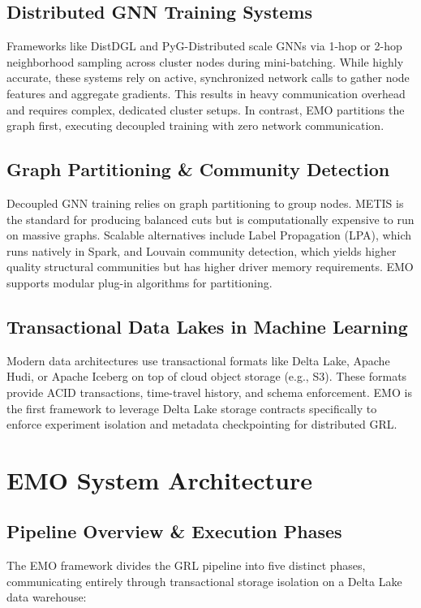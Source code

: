 \documentclass[conference,compsoc]{IEEEtran}
\begin{document}
\subsection{Distributed GNN Training Systems}
Frameworks like DistDGL and PyG-Distributed scale GNNs via 1-hop or 2-hop neighborhood sampling across cluster nodes during mini-batching. While highly accurate, these systems rely on active, synchronized network calls to gather node features and aggregate gradients. This results in heavy communication overhead and requires complex, dedicated cluster setups. In contrast, EMO partitions the graph first, executing decoupled training with zero network communication.

\subsection{Graph Partitioning \& Community Detection}
Decoupled GNN training relies on graph partitioning to group nodes. METIS is the standard for producing balanced cuts but is computationally expensive to run on massive graphs. Scalable alternatives include Label Propagation (LPA), which runs natively in Spark, and Louvain community detection, which yields higher quality structural communities but has higher driver memory requirements. EMO supports modular plug-in algorithms for partitioning.

\subsection{Transactional Data Lakes in Machine Learning}
Modern data architectures use transactional formats like Delta Lake, Apache Hudi, or Apache Iceberg on top of cloud object storage (e.g., S3). These formats provide ACID transactions, time-travel history, and schema enforcement. EMO is the first framework to leverage Delta Lake storage contracts specifically to enforce experiment isolation and metadata checkpointing for distributed GRL.

\section{EMO System Architecture}
\subsection{Pipeline Overview \& Execution Phases}
The EMO framework divides the GRL pipeline into five distinct phases, communicating entirely through transactional storage isolation on a Delta Lake data warehouse:
\end{document}
